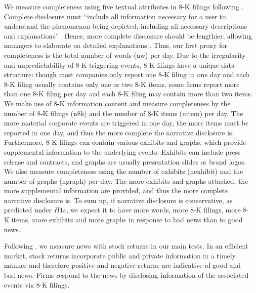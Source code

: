 \documentclass[letterpaper,12pt]{article}
\begin{document}
\begin{spacing}{1.5}
We measure completeness using five textual attributes in 8-K filings following . Complete disclosure must ``include all information necessary for a user to understand the phenomenon being depicted, including all necessary descriptions and explanations" \cite[QC12]{fasbConceptualFrameworkFinancial2018}. Hence, more complete disclosure should be lengthier, allowing managers to elaborate on detailed explanations \cite{leuzDisclosureCostCapital2009}. Thus, our first proxy for completeness is the total number of words (nw) per day. Due to the irregularity and unpredictability of 8-K triggering events, 8-K filings have a unique data structure: though most companies only report one 8-K filing in one day and each 8-K filing usually contains only one or two 8-K items, some firms report more than one 8-K filing per day and each 8-K filing may contain more than two items. We make use of 8-K information content and measure completeness by the number of 8-K filings (n8k) and the number of 8-K items (nitem) per day. The more material corporate events are triggered in one day, the more items must be reported in one day, and thus the more complete the narrative disclosure is. Furthermore, 8-K filings can contain various exhibits and graphs, which provide supplemental information to the underlying events. Exhibits can include press release and contracts, and graphs are usually presentation slides or brand logos. We also measure completeness using the number of exhibits (nexhibit) and the number of graphs (ngraph) per day. The more exhibits and graphs attached, the more supplemental information are provided, and thus the more complete narrative disclosure is.
To sum up, if narrative disclosure is conservative, as predicted under $H1c$, we expect it to have more words, more 8-K filings, more 8-K items, more exhibits and more graphs in response to bad news than to good news.

Following , we measure news with stock returns in our main tests.
In an efficient market, stock returns incorporate public and private information in a timely manner and therefore positive and negative returns are indicative of good and bad news.
Firms respond to the news by disclosing information of the associated events via 8-K filings. 


\end{spacing}
\end{document}
